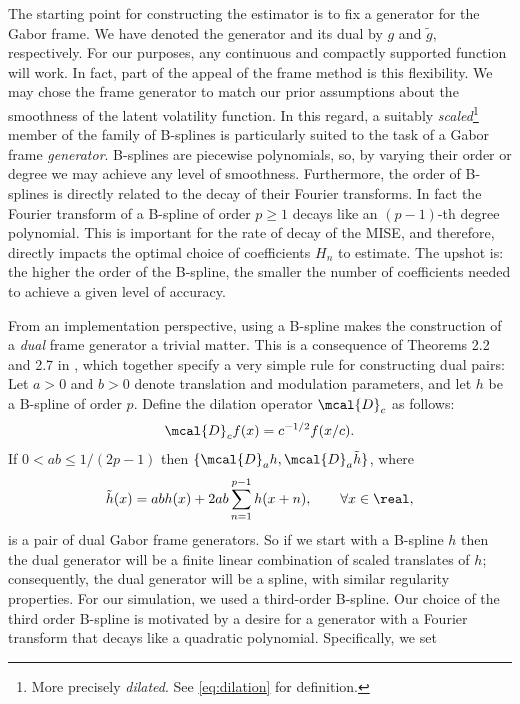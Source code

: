 The starting point for constructing the estimator is to fix a generator for the Gabor frame. We have denoted the generator and its dual by $g$ and $\tilde{g}$, respectively. For our purposes, any continuous and compactly supported function will work. In fact, part of the appeal of the frame method is this flexibility. We may chose the frame generator to match our prior assumptions about the smoothness of the latent volatility function. In this regard, a suitably \emph{scaled}\footnote{More precisely \emph{dilated}. See \eqref{eq:dilation} for definition.} member of the family of B-splines is particularly suited to the task of a Gabor frame \emph{generator}. B-splines are  piecewise polynomials, so,  by varying their order or degree we may achieve any level of smoothness. Furthermore, the order of B-splines is directly related to the decay of their Fourier transforms. In fact the Fourier transform of a B-spline of order $p \ge 1$ decays like an $(p-1)$-th degree polynomial. This is important for the rate of decay of the MISE, and therefore, directly impacts the optimal choice of coefficients $H_n$ to estimate. The upshot is:  the higher the order of the B-spline, the smaller the number of  coefficients needed to achieve a given level of accuracy.       


From an implementation perspective, using a  B-spline  makes the construction of a \emph{dual}  frame generator a trivial matter. This is a consequence of Theorems 2.2 and 2.7 in \cite{Christensen2006}, which together specify a very simple rule for constructing  dual pairs: Let $a>0$ and $b>0$ denote  translation and modulation parameters, and let   $h$ be a B-spline of order $p$. Define the dilation operator  $\mcal{D}_c$ as follows:
\begin{align}
  \mcal{D}_c f(x) = c^{-1/2}f(x/c).  \label{eq:dilation}
\end{align}
If $0 < ab \le 1/(2 p -1)$ then  $\{\mcal{D}_a h, \mcal{D}_a\tilde{h}\}$, where 
\begin{align}
  \tilde{h}(x) = ab h(x) + 2 a b \sum^{p-1}_{n=1} h(x+n), \qquad \forall x \in \real, 
  \label{eq:gt}
\end{align}
is a pair of  dual Gabor  frame generators. So if we start with a B-spline $h$ then the dual generator will be a finite linear combination of scaled translates of $h$; consequently, the  dual generator will be a spline, with similar regularity properties.  For our simulation, we used a third-order B-spline. Our choice of the third order B-spline is motivated by a desire for a generator with a  Fourier transform that decays like a quadratic polynomial.   Specifically, we set
